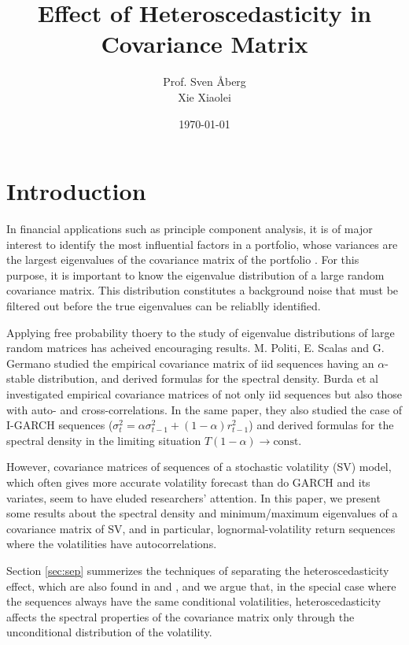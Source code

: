 \documentclass{article}
\author{
  Prof. Sven \AA berg \\
  Xie Xiaolei}
\date{\today}
\title{Effect of Heteroscedasticity in Covariance Matrix}
\begin{document}
\maketitle

\section{Introduction}
In financial applications such as principle component analysis, it is
of major interest to identify the most influential factors in a
portfolio, whose variances are the largest eigenvalues of the
covariance matrix of the portfolio \cite{Potters2003}. For this
purpose, it is important to know the eigenvalue distribution of a
large random covariance matrix. This distribution constitutes a
background noise that must be filtered out before the true eigenvalues
can be reliablly identified.

Applying free probability thoery to the study of eigenvalue
distributions of large random matrices has acheived encouraging
results. M. Politi, E. Scalas and G. Germano \cite{politi2010} studied
the empirical covariance matrix of iid sequences having an
$\alpha$-stable distribution, and derived formulas for the spectral
density. Burda et al \cite{burda2011} investigated empirical
covariance matrices of not only iid sequences but also those with
auto- and cross-correlations. In the same paper, they also studied the
case of I-GARCH sequences ($\sigma^2_t = \alpha \sigma^2_{t-1} + (1 -
\alpha) r^2_{t-1}$) and derived formulas for the spectral density in
the limiting situation $T(1-\alpha) \to \text{const}$.

However, covariance matrices of sequences of a stochastic volatility
(SV) model, which often gives more accurate volatility forecast than
do GARCH and its variates, seem to have eluded researchers'
attention. In this paper, we present some results about the spectral
density and minimum/maximum eigenvalues of a covariance matrix of SV,
and in particular, lognormal-volatility return sequences where the
volatilities have autocorrelations.

Section \ref{sec:sep} summerizes the techniques of separating the
heteroscedasticity effect, which are also found in
\cite{biroli2007student} and \cite{burda2011}, and we argue that, in
the special case where the sequences always have the same
conditional volatilities, heteroscedasticity affects the spectral
properties of the covariance matrix only through the unconditional
distribution of the volatility.
\end{document}
